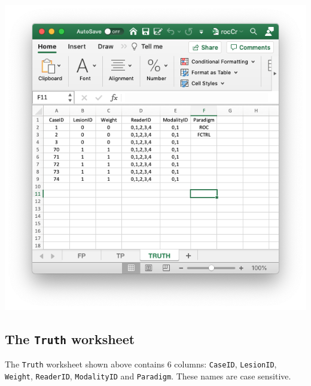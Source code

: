 \documentclass[
]{book}
\begin{document}
\includegraphics[width=1\textwidth,height=\textheight]{images/quick-start/rocCrTruth.png}

\hypertarget{quick-start-roc-truth}{%
\subsection{\texorpdfstring{The \texttt{Truth} worksheet}{The Truth worksheet}}\label{quick-start-roc-truth}}

The \texttt{Truth} worksheet shown above contains 6 columns: \texttt{CaseID}, \texttt{LesionID}, \texttt{Weight}, \texttt{ReaderID}, \texttt{ModalityID} and \texttt{Paradigm}. These names are case sensitive.
\end{document}
